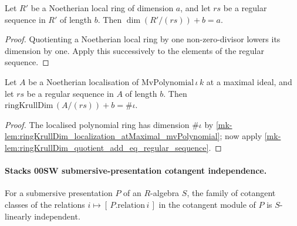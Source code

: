 \begin{lemma}
  \label{mk-lem:ringKrullDim_quotient_add_eq_regular_sequence}
  Let \(R'\) be a Noetherian local ring of dimension \(a\), and let
  \(rs\) be a regular sequence in \(R'\) of length \(b\). Then
  \(\dim(R'/(rs)) + b = a\).
\end{lemma}

\begin{proof}
  Quotienting a Noetherian local ring by one non-zero-divisor lowers its
  dimension by one.  Apply this successively to the elements of the
  regular sequence.
\end{proof}

\begin{lemma}
  \label{mk-lem:ringKrullDim_quotient_localization_mvPolynomial_regular}

  Let \(A\) be a Noetherian localisation of \(\mathrm{MvPolynomial}\,\iota\,k\) at a
  maximal ideal, and let \(rs\) be a regular sequence in \(A\) of length \(b\). Then
  \(\mathrm{ringKrullDim}\,(A/(rs)) + b = \#\iota\).
\end{lemma}

\begin{proof}
  The localised polynomial ring has dimension \(\#\iota\) by
  \ref{mk-lem:ringKrullDim_localization_atMaximal_mvPolynomial}; now apply
  \ref{mk-lem:ringKrullDim_quotient_add_eq_regular_sequence}.
\end{proof}

\paragraph{Stacks 00SW submersive-presentation cotangent independence.}

\begin{lemma}
  \label{mk-lem:submersive_relation_cotangent_linearIndependent}
  For a submersive presentation \(P\) of an \(R\)-algebra \(S\), the family of
  cotangent classes of the relations \(i \mapsto [\,P.\mathrm{relation}\,i\,]\) in the
  cotangent module of \(P\) is \(S\)-linearly independent.
\end{lemma}

